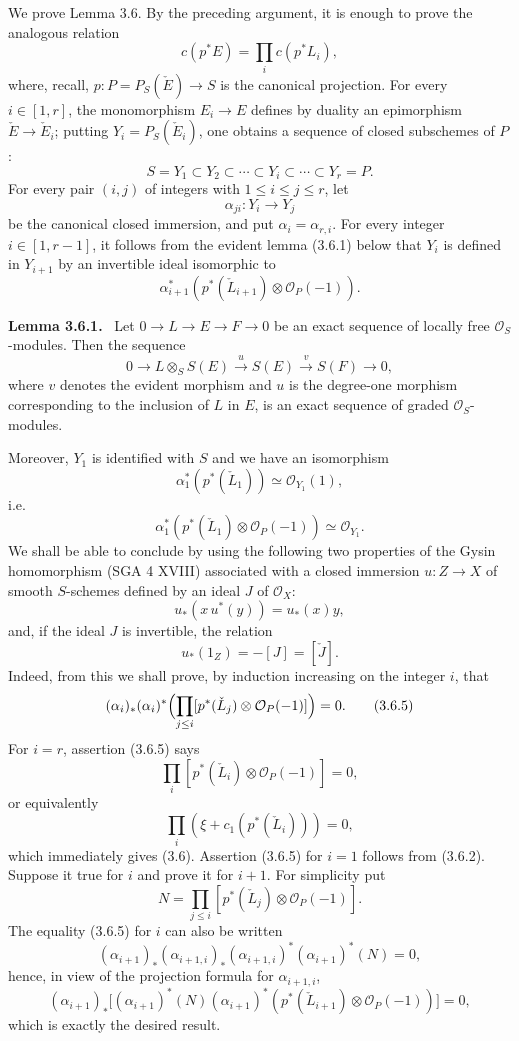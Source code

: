 \documentclass[11pt]{article}
\newenvironment{statement}[1]{\par\medskip\noindent\textbf{#1.}\ }{\par\medskip}
\begin{document}
We prove Lemma 3.6. By the preceding argument, it is enough to prove the analogous relation
\[
c(p^*E)=\prod_i c(p^*L_i),
\]
where, recall, $p:P=P_S(\check E)\to S$ is the canonical projection. For every $i\in[1,r]$, the monomorphism $E_i\to E$ defines by duality an epimorphism $\check E\to\check E_i$; putting $Y_i=P_S(\check E_i)$, one obtains a sequence of closed subschemes of $P$:
\[
S=Y_1\subset Y_2\subset\cdots\subset Y_i\subset\cdots\subset Y_r=P.
\]
For every pair $(i,j)$ of integers with $1\le i\le j\le r$, let
\[
\alpha_{ji}:Y_i\to Y_j
\]
be the canonical closed immersion, and put $\alpha_i=\alpha_{r,i}$. For every integer $i\in[1,r-1]$, it follows from the evident lemma (3.6.1) below that $Y_i$ is defined in $Y_{i+1}$ by an invertible ideal isomorphic to
\[
\alpha_{i+1}^*(p^*(\check L_{i+1})\otimes\mathcal O_P(-1)).
\]

\begin{statement}{Lemma 3.6.1}
Let $0\to L\to E\to F\to0$ be an exact sequence of locally free $\mathcal O_S$-modules. Then the sequence
\[
0\to L\otimes_S S(E)\xrightarrow{u}S(E)\xrightarrow{v}S(F)\to0,
\]
where $v$ denotes the evident morphism and $u$ is the degree-one morphism corresponding to the inclusion of $L$ in $E$, is an exact sequence of graded $\mathcal O_S$-modules.
\end{statement}

Moreover, $Y_1$ is identified with $S$ and we have an isomorphism
\[
\alpha_1^*(p^*(\check L_1))\simeq\mathcal O_{Y_1}(1),
\]
i.e.
\[
\alpha_1^*(p^*(\check L_1)\otimes\mathcal O_P(-1))\simeq \mathcal O_{Y_1}.
\tag{3.6.2}
\]
We shall be able to conclude by using the following two properties of the Gysin homomorphism (SGA 4 XVIII) associated with a closed immersion $u:Z\to X$ of smooth $S$-schemes defined by an ideal $J$ of $\mathcal O_X$:
\[
u_*(x\,u^*(y))=u_*(x)y,
\tag{3.6.3}
\]
and, if the ideal $J$ is invertible, the relation
\[
u_*(1_Z)=-[J]=[\check J].
\tag{3.6.4}
\]
Indeed, from this we shall prove, by induction increasing on the integer $i$, that
\[
(\alpha_i)_*(\alpha_i)^*\Bigl(\prod_{j\le i}[p^*(\check L_j)\otimes\mathcal O_P(-1)]\Bigr)=0.
\tag{3.6.5}
\]
For $i=r$, assertion (3.6.5) says
\[
\prod_i[p^*(\check L_i)\otimes\mathcal O_P(-1)]=0,
\]
or equivalently
\[
\prod_i(\xi+c_1(p^*(\check L_i)))=0,
\]
which immediately gives (3.6). Assertion (3.6.5) for $i=1$ follows from (3.6.2). Suppose it true for $i$ and prove it for $i+1$. For simplicity put
\[
N=\prod_{j\le i}[p^*(\check L_j)\otimes\mathcal O_P(-1)].
\]
The equality (3.6.5) for $i$ can also be written
\[
(\alpha_{i+1})_*(\alpha_{i+1,i})_*(\alpha_{i+1,i})^*(\alpha_{i+1})^*(N)=0,
\]
hence, in view of the projection formula for $\alpha_{i+1,i}$,
\[
(\alpha_{i+1})_*\bigl[(\alpha_{i+1})^*(N)(\alpha_{i+1})^*(p^*(\check L_{i+1})\otimes\mathcal O_P(-1))\bigr]=0,
\]
which is exactly the desired result.
\end{document}
